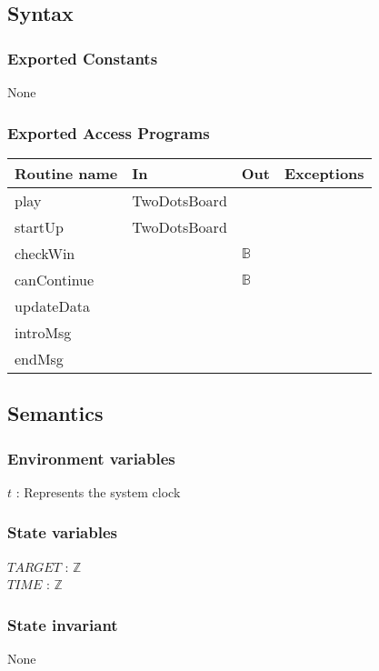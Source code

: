 \documentclass[12pt]{article}
\begin{document}
\subsection* {Syntax}

\subsubsection* {Exported Constants}

None

\subsubsection* {Exported Access Programs}

\begin{tabular}{| l | l | l | p{6cm} |}
\hline
\textbf{Routine name} & \textbf{In} & \textbf{Out} & \textbf{Exceptions}\\
\hline
play & TwoDotsBoard & & \\
\hline
startUp & TwoDotsBoard & & \\
\hline
checkWin & & $\mathbb{B}$ & \\
\hline
canContinue &  & $\mathbb{B}$ & \\
\hline
updateData &  & & \\
\hline
introMsg & & & \\
\hline
endMsg & & & \\
\hline
\end{tabular}

\subsection* {Semantics}

\subsubsection* {Environment variables}
\noindent $t$ : Represents the system clock\\



\subsubsection* {State variables}
\noindent $TARGET$ : $\mathbb{Z}$\\
\noindent $TIME$ : $\mathbb{Z}$\\


\subsubsection*{State invariant}
\noindent None
\end{document}
